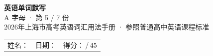 \documentclass[10pt,a4paper]{article}
\begin{document}
\pagestyle{plain}

\begin{center}
{\LARGE\bfseries 英语单词默写}\\[0.22em]
{\large A 字母 · 第 5 / 7 份}\\[0.18em]
{\small 2026年上海市高考英语词汇用法手册 · 参照普通高中英语课程标准}
\end{center}

\vspace{0.25em}
\noindent\begin{tabular}{@{}p{}@{}p{}@{}p{}@{}}
姓名：\underline{\hspace{2.0cm}} & 日期：\underline{\hspace{2.0cm}} & 得分：\underline{\hspace{1.3cm}}\,/\,45 \\
\end{tabular}

\vspace{0.3em}

\vspace{0.08em}
\end{document}
